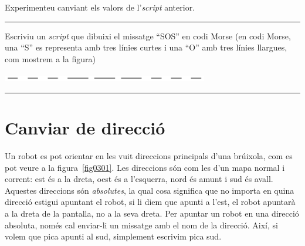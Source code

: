 \begin{center}
\colorbox{black}{}
\end{center}
{\small
\noindent
Experimenteu canviant els valors de l'\emph{script} anterior.}\\
\noindent
\rule{\textwidth}{3pt}

\newpage

\begin{center}
\colorbox{black}{}
\end{center}
{\small
\noindent
Escriviu un \emph{script} que dibuixi el missatge ``SOS'' en codi Morse (en codi Morse, una ``S'' es representa amb tres línies curtes i una ``O'' amb tres línies llargues, com mostrem a la figura)}
\begin{center}
\includegraphics[height=3mm ,width=90mm]{Imatges/figuraE3-2.png}
\end{center}
\noindent
\rule{\textwidth}{3pt}
\section{Canviar de direcció}
Un robot es pot orientar en les vuit direccions principals d'una brúixola, com es pot veure a la figura~\ref{fig0301}. Les direccions són com les d'un mapa normal i corrent: est és a la dreta, oest és a l'esquerra, nord és amunt i sud és avall. Aquestes direccions són \emph{absolutes}, la qual cosa significa que no importa en quina direcció estigui apuntant el robot, si li diem que apunti a l'\textsf{est}, el robot apuntarà a la dreta de la pantalla, no a la seva dreta. Per apuntar un robot  en una direcció absoluta, només cal enviar-li un missatge amb el nom de la direcció. Així, si volem que \textsf{pica} apunti al sud, simplement escrivim \textsf{pica sud}.  

